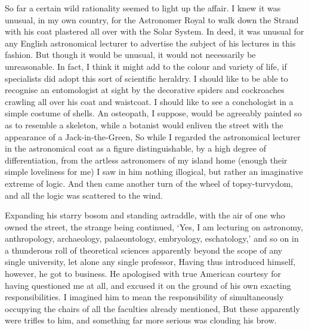 \documentclass{book}
\begin{document}
So far a certain wild rationality seemed to light up the affair. I knew it was unusual, in my own country, for the Astronomer Royal to walk down the Strand with his coat plastered all over with the Solar System. In deed, it was unusual for any English astronomical lecturer to advertise the subject of his lectures in this fashion. But though it would be unusual, it would not necessarily be unreasonable. In fact, I think it might add to the colour and variety of life, if specialists did adopt this sort of scientific heraldry. I should like to be able to recognise an entomologist at sight by the decorative spiders and cockroaches crawling all over his coat and waistcoat. I should like to see a conchologist in a simple costume of shells. An osteopath, I suppose, would be agreeably painted so as to resemble a skeleton, while a botanist would enliven the street with the appearance of a Jack-in-the-Green, So while I regarded the astronomical lecturer in the astronomical coat as a figure distinguishable, by a high degree of differentiation, from the artless astronomers of my island home (enough their simple loveliness for me) I saw in him nothing illogical, but rather an imaginative extreme of logic. And then came another turn of the wheel of topsy-turvydom, and all the logic was scattered to the wind.

Expanding his starry bosom and standing astraddle, with the air of one who owned the street, the strange being continued, ‘Yes, I am lecturing on astronomy, anthropology, archaeology, palaeontology, embryology, eschatology,’ and so on in a thunderous roll of theoretical sciences apparently beyond the scope of any single university, let alone any single professor, Having thus introduced himself, however, he got to business. He apologised with true American courtesy for having questioned me at all, and excused it on the ground of his own exacting responsibilities. I imagined him to mean the responsibility of simultaneously occupying the chairs of all the faculties already mentioned, But these apparently were trifles to him, and something far more serious was clouding his brow.
\end{document}
